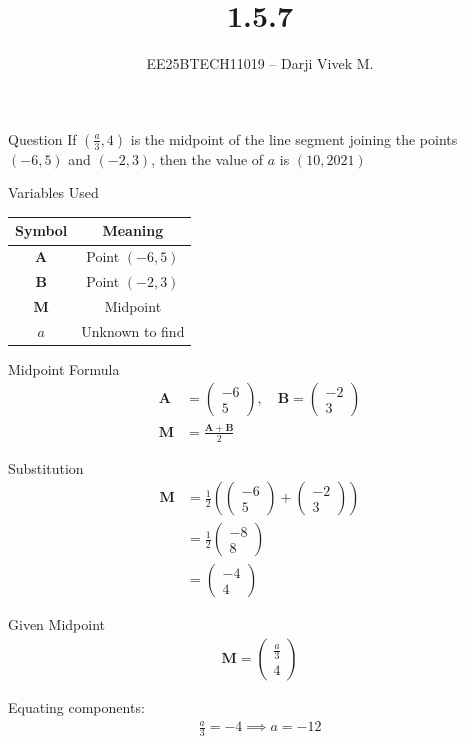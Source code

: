 \documentclass{beamer}
\title{1.5.7}
\author{EE25BTECH11019 -- Darji Vivek M.}
\date{}
\newcommand{\myvec}[1]{\begin{pmatrix}#1\end{pmatrix}}
\newcommand{\brak}[1]{\left( #1 \right)}
\renewcommand{\vec}[1]{\mathbf{#1}}
\begin{document}
\begin{frame}
  \titlepage
\end{frame}

\begin{frame}{Question}
If $\brak{\tfrac{a}{3},4}$ is the midpoint of the line segment joining 
the points $\brak{-6,5}$ and $\brak{-2,3}$, then the value of $a$ is
\hfill $\brak{10,2021}$
\end{frame}

\begin{frame}{Variables Used}
\begin{table}[h!]    
  \centering
  \begin{tabular}{|c|c|}
    \hline
    Symbol & Meaning \\ \hline
    $\vec{A}$ & Point $(-6,5)$ \\ \hline
    $\vec{B}$ & Point $(-2,3)$ \\ \hline
    $\vec{M}$ & Midpoint \\ \hline
    $a$ & Unknown to find \\ \hline
  \end{tabular}
\end{table}
\end{frame}

\begin{frame}{Midpoint Formula}
\begin{align}
\vec{A} &= \myvec{-6\\5}, \quad 
\vec{B} = \myvec{-2\\3} \\[6pt]
\vec{M} &= \frac{\vec{A}+\vec{B}}{2}
\end{align}
\end{frame}

\begin{frame}{Substitution}
\begin{align}
\vec{M} &= \tfrac{1}{2}\brak{\myvec{-6\\5}+\myvec{-2\\3}} \\[6pt]
&= \tfrac{1}{2}\myvec{-8\\8} \\[6pt]
&= \myvec{-4\\4}
\end{align}
\end{frame}

\begin{frame}{Given Midpoint}
\begin{align}
\vec{M} = \myvec{\tfrac{a}{3}\\4}
\end{align}

Equating components:
\begin{align}
\tfrac{a}{3} = -4 \implies a = -12
\end{align}
\end{frame}
\end{document}
